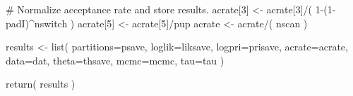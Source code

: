 \begin{Examples}
\begin{ExampleCode}
{  # Normalize acceptance rate and store results.
  acrate[3] <- acrate[3]/( 1-(1-padI)^nswitch )
  acrate[5] <- acrate[5]/pup
  acrate <- acrate/( nscan )
  
  results <- list( partitions=psave, loglik=liksave, logpri=prisave, 
                   acrate=acrate, data=dat, theta=thsave, 
                   mcmc=mcmc, tau=tau )

  return( results )
 }
\end{ExampleCode}
\end{Examples}

